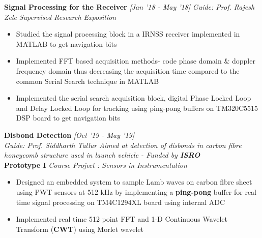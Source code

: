 \documentclass[11pt]{article}%
\begin{document}
\flushleft \textbf{Signal Processing for the Receiver}  \hfill{\em{[Jan '18 - May '18]}}
\vspace{-2mm}
{\flushleft \em{Guide: Prof. Rajesh Zele}} \hfill{\em{ Supervised Research Exposition}} 
\vspace{0mm}
\begin{itemize}[leftmargin=*]
	\setlength\itemsep{0.01em}
    \vspace{-2mm}	
     \item Studied the signal processing block in a IRNSS receiver implemented in MATLAB to get navigation bits 
     \item Implemented FFT based acquisition methods- code phase domain \& doppler frequency domain thus decreasing the acquisition time compared to the common Serial Search technique in MATLAB 
     \item Implemented the serial search acquisition block, digital Phase Locked Loop and Delay Locked Loop for tracking using ping-pong buffers on TM320C5515 DSP board to get navigation bits  
\end{itemize}
\newpage

{\flushleft \bf \large{Disbond Detection}} \hfill {{{\em{[Oct '19 - May '19]}}}} \\

 {\flushleft \em{Guide: Prof. Siddharth Tallur}}
\vspace{-3mm}
{\flushleft \em{Aimed at detection of disbonds in carbon fibre honeycomb structure used in launch vehicle - Funded by \textbf{ISRO}}}\\

\flushleft \textbf{Prototype I} \hfill{\em{Course Project : Sensors in Instrumentation}}  
\vspace{-2mm}
\begin{itemize}[leftmargin=*]
	\setlength\itemsep{0.01em}
    \vspace{0mm}	
    \item Designed an embedded system to sample Lamb waves on carbon fibre sheet using PWT sensors at 512 kHz by implementing a \textbf{ping-pong} buffer for real time signal processing on TM4C1294XL board using internal ADC
    \item Implemented real time 512 point FFT and 1-D Continuous Wavelet Transform (\textbf{CWT}) using Morlet wavelet
\end{itemize}
\end{document}
